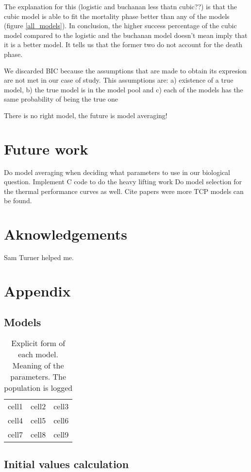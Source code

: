 \documentclass[titlepage,11pt]{article}
\begin{document}
\begin{linenumbers}
	The explanation for this (logistic and buchanan less thatn cubic??) is that the cubic model is able to fit the mortality phase better than any of the models (figure \ref{all_models}). In conclusion, the higher success percentage of the cubic model compared to the logistic and the buchanan model doesn't mean imply that it is a better model. It tells us that the former two do not account for the death phase. 
	
	We discarded BIC because the assumptions that are made to obtain its expresion are not met in our case of study. This assumptions are: a) existence of a true model, b) the true model is in the model pool and c) each of the  models has the same probability of being the true one 
	
	There is no right model, the future is model averaging!
	
	\section{Future work}
	Do model averaging when deciding what parameters to use in our biological question. Implement C code to do the heavy lifting work
	Do model selection for the thermal performance curves as well. Cite papers were more TCP models can be found.
	
	\section{Aknowledgements}
	Sam Turner helped me.
	\newpage
	\section{Appendix}
	\subsection{Models}
	\begin{table}[h]
		\centering
		\begin{tabular}{ c c c }
			cell1 & cell2 & cell3 \\ 
			cell4 & cell5 & cell6 \\  
			cell7 & cell8 & cell9    
		\end{tabular}
		\caption{\label{tab:model_eqs}Explicit form of each model. Meaning of the parameters. The population is logged}
	\end{table}
	\subsection{Initial values calculation}\label{subsec:initial_values}

\end{linenumbers}
\end{document}
